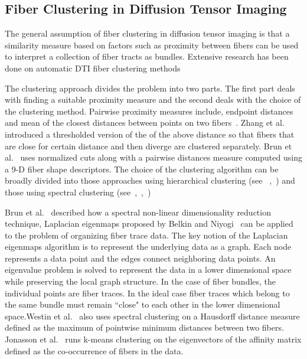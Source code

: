 \subsection {Fiber Clustering in Diffusion Tensor Imaging}
\label {subsec:fiberClus}
The general assumption of fiber clustering in diffusion tensor imaging is that a similarity measure based on factors such as proximity between fibers can be used to interpret a collection of fiber tracts as bundles. Extensive research has been done on automatic DTI fiber clustering methods

The clustering approach divides the problem into two parts. The first part deals with finding a suitable proximity measure and the second deals with the choice of the clustering method. Pairwise proximity measures include, endpoint distances~\cite{Brun2003} and mean of the closest distances between points on two fibers~\cite{Corouge2004}. Zhang et al.~\cite{Zhang2008} introduced a thresholded version of the of the above distance so that fibers that are close for certain distance and then diverge are clustered separately. Brun et al.~\cite{Brun2004} uses normalized cuts along with a pairwise distances  measure computed using a 9-D fiber shape descriptors. The choice of the clustering algorithm can be broadly divided into those approaches using hierarchical clustering (see ~\cite{Moberts2005},~\cite{Zhang2008}) and those using spectral clustering (see~\cite{jonasson2005},~\cite{ODonnell2007},~\cite{Brun2004})
 
Brun et al.~\cite{Brun2003} described how a spectral non-linear dimensionality reduction technique,  Laplacian eigenmaps proposed by Belkin and Niyogi~\cite{Belkin01} can be applied to the problem of organizing fiber trace data. The key notion of the Laplacian eigenmaps algorithm is to represent the underlying data as a graph. Each node represents a data point and the edges connect neighboring data points. An eigenvalue problem is solved to represent the data in a lower dimensional space while preserving the local graph structure. In the case of fiber bundles, the individual points are fiber traces. In the ideal case fiber traces which belong to the same bundle must remain ``close" to each other in the lower dimensional space.Westin et al.~\cite{westinMEDIA02} also uses spectral clustering on a Hausdorff distance measure defined as the maximum of pointwise minimum distances between two fibers. Jonasson et al.~\cite{jonasson2005} runs k-means clustering on the eigenvectors of the affinity matrix defined as the co-occurrence of fibers in the data.

